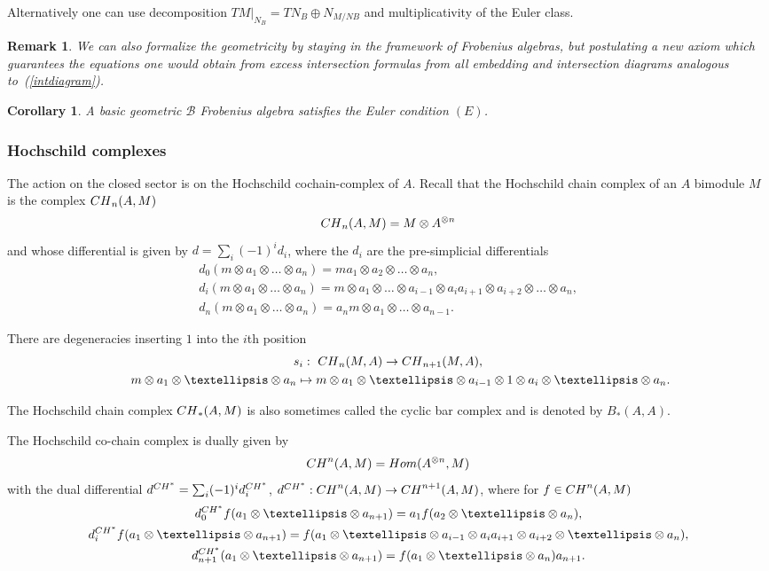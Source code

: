 \documentclass[11pt]{article}
\newtheorem{cor}[thm]{Corollary}
\newtheorem{rmk}[thm]{Remark}
\def\calB{{\mathcal B}}
\def\oto{\otimes \dots \otimes}
\newcommand{\aoa}[2]{a_{#1}\otimes \dots \otimes a_{#2}}
\def\d{d^{{\rm CH}^*}}
\begin{document}
Alternatively one can use decomposition $TM|_{N_B}=TN_B\oplus N_{M/NB}$ and multiplicativity of the Euler class.

\begin{rmk}
We can also formalize the geometricity by  staying in the framework of Frobenius algebras, but
postulating a new axiom which guarantees the equations one would obtain from excess intersection formulas from all embedding and intersection diagrams analogous to~(\ref{intdiagram}).
\end{rmk}

\begin{cor}
A basic geometric $\calB$ Frobenius algebra satisfies the Euler condition $(E)$.
\end{cor}

\subsubsection{Hochschild complexes}
The action on the closed sector is on the Hochschild cochain-complex of $A$.
Recall that the Hochschild chain complex of an $A$ bimodule $M$ is the complex ${\rm CH}_n(A,M)$
\[
{\rm CH}_n(A,M)=M\otimes A^{\otimes n}
\]
and whose  dif\/ferential is given by $d=\sum_i (-1)^i d_i$,
where the $d_i$ are the pre-simplicial dif\/ferentials
\begin{gather*}
d_0 (m\otimes a_1 \oto a_n ) = m a_1 \otimes\aoa{2}{n},\\
d_i (m\otimes a_1 \oto a_n) = m\otimes \aoa{1}{i-1}\otimes a_{i}a_{i+1}\otimes
\aoa{i+2}{n}, \\
d_{n} ( m\otimes a_1 \oto a_n ) = a_n m\otimes\aoa{1}{n-1}.
\end{gather*}


There are degeneracies inserting $1$ into the $i$th position
\begin{gather*}
s_i: \ {\rm CH}_n(M,A) \to {\rm CH}_{n+1}(M,A),\\
\phantom{s_i:}{} \ \ m\otimes a_1 \oto a_n \mapsto m\otimes a_1
\oto a_{i-1}\otimes  1 \otimes a_i \oto a_n.
\end{gather*}

The Hochschild chain complex ${\rm CH}_*(A,M)$ is also sometimes called
the cyclic bar complex and is denoted by $B_*(A,A)$.


The Hochschild co-chain complex is dually given by
\[
{\rm CH}^n(A,M)={\rm Hom}(A^{\otimes n},M)
\]
with the dual dif\/ferential $\d=\sum_i (-1)^i \d_i$,
$\d:{\rm CH}^n(A,M)\to {\rm CH}^{n+1}(A,M)$, where for $f\in {\rm CH}^n(A,M)$
\begin{gather*}
\d_0 f( a_1 \oto a_{n+1} ) =  a_1f(\aoa{2}{n}),\\
\d_i f(a_1 \oto a_{n+1}) = f(\aoa{1}{i-1}\otimes a_{i}a_{i+1}\otimes
\aoa{i+2}{n}), \\
\d_{n+1} ( a_1 \oto a_{n+1}) = f(\aoa{1}{n})a_{n+1}.
\end{gather*}
\end{document}
